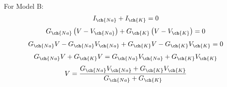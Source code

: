 \documentclass[11pt]{article}
\begin{document}
\begin{enumerate}[label=\arabic*.]
\begin{enumerate}[label=(\alph*)]
\begin{align*}
\end{align*}
For Model B:
\begin{align*}
I_{\ch{Na}} + I_{\ch{K}} = 0
\end{align*}
\begin{align*}
G_{\ch{Na}}\left(V - V_{\ch{Na}}\right) + G_{\ch{K}}\left(V - V_{\ch{K}}\right) = 0
\end{align*}
\begin{align*}
G_{\ch{Na}} V - G_{\ch{Na}} V_{\ch{Na}} + G_{\ch{K}} V - G_{\ch{K}} V_{\ch{K}} = 0
\end{align*}
\begin{align*}
G_{\ch{Na}} V + G_{\ch{K}} V = G_{\ch{Na}} V_{\ch{Na}} + G_{\ch{K}} V_{\ch{K}}
\end{align*}
\begin{align*}
V = \frac{G_{\ch{Na}} V_{\ch{Na}} + G_{\ch{K}} V_{\ch{K}}} {G_{\ch{Na}} + G_{\ch{K}}}
\end{align*}




\end{enumerate}
\end{enumerate}
\end{document}
